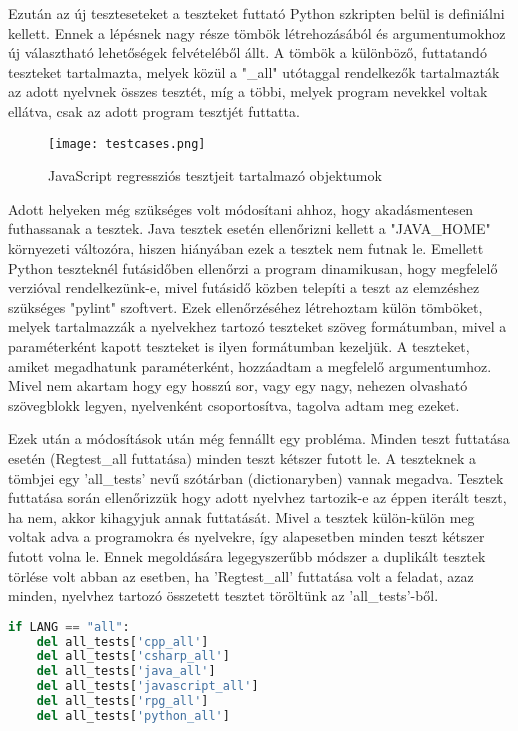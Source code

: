 Ezután az új teszteseteket a teszteket futtató Python szkripten belül is definiálni kellett.
Ennek a lépésnek nagy része tömbök létrehozásából és argumentumokhoz új választható lehetőségek felvételéből állt. A tömbök a különböző, futtatandó teszteket tartalmazta, melyek közül a "\_all" utótaggal rendelkezők tartalmazták az adott nyelvnek összes tesztét, míg a többi, melyek program nevekkel voltak ellátva, csak az adott program tesztjét futtatta.

\begin{figure}[!htbp]
    \caption{JavaScript regressziós tesztjeit tartalmazó objektumok}\label{fig:testcases}
    \centering
    \texttt{[image: testcases.png]}
\end{figure}

Adott helyeken még szükséges volt módosítani ahhoz, hogy akadásmentesen futhassanak a tesztek. Java tesztek esetén ellenőrizni kellett a "JAVA\_HOME" környezeti változóra, hiszen hiányában ezek a tesztek nem futnak le. Emellett Python teszteknél futásidőben ellenőrzi a program dinamikusan, hogy megfelelő verzióval rendelkezünk-e, mivel futásidő közben telepíti a teszt az elemzéshez szükséges "pylint" szoftvert.
Ezek ellenőrzéséhez létrehoztam külön tömböket, melyek tartalmazzák a nyelvekhez tartozó teszteket szöveg formátumban, mivel a paraméterként kapott teszteket is ilyen formátumban kezeljük.
A teszteket, amiket megadhatunk paraméterként, hozzáadtam a megfelelő argumentumhoz. Mivel nem akartam hogy egy hosszú sor, vagy egy nagy, nehezen olvasható szövegblokk legyen, nyelvenként csoportosítva, tagolva adtam meg ezeket.

Ezek után a módosítások után még fennállt egy probléma. Minden teszt futtatása esetén (Regtest\_all futtatása) minden teszt kétszer futott le. A teszteknek a tömbjei egy 'all\_tests' nevű szótárban (dictionaryben) vannak megadva. Tesztek futtatása során ellenőrizzük hogy adott nyelvhez tartozik-e az éppen iterált teszt, ha nem, akkor kihagyjuk annak futtatását. Mivel a tesztek külön-külön meg voltak adva a programokra és nyelvekre, így alapesetben minden teszt kétszer futott volna le. Ennek megoldására legegyszerűbb módszer a duplikált tesztek törlése volt abban az esetben, ha 'Regtest\_all' futtatása volt a feladat, azaz minden, nyelvhez tartozó összetett tesztet töröltünk az 'all\_tests'-ből. 


\begin{lstlisting}[caption={CMake célpontok JavaScript teszteléshez},label={lst:abs-computedfiltering}, language={Python}]
if LANG == "all":
    del all_tests['cpp_all']
    del all_tests['csharp_all']
    del all_tests['java_all']
    del all_tests['javascript_all']
    del all_tests['rpg_all']
    del all_tests['python_all']
\end{lstlisting}